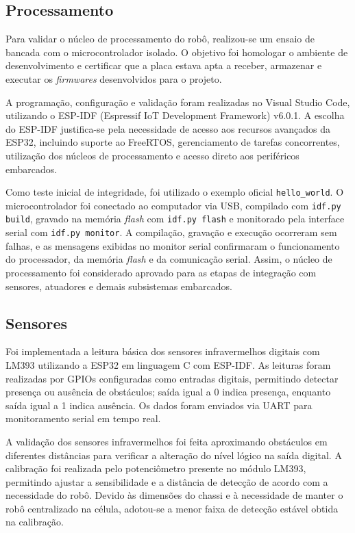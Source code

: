 \subsection{Processamento}

Para validar o núcleo de processamento do robô, realizou-se um ensaio de bancada
com o microcontrolador isolado. O objetivo foi homologar o ambiente de
desenvolvimento e certificar que a placa estava apta a receber, armazenar e
executar os \textit{firmwares} desenvolvidos para o projeto.

A programação, configuração e validação foram realizadas no Visual Studio Code,
utilizando o ESP-IDF (Espressif IoT Development Framework) v6.0.1. A escolha do
ESP-IDF justifica-se pela necessidade de acesso aos recursos avançados da ESP32,
incluindo suporte ao FreeRTOS, gerenciamento de tarefas concorrentes, utilização
dos núcleos de processamento e acesso direto aos periféricos embarcados.

Como teste inicial de integridade, foi utilizado o exemplo oficial
\texttt{hello\_world}. O microcontrolador foi conectado ao computador via USB,
compilado com \texttt{idf.py build}, gravado na memória \textit{flash} com
\texttt{idf.py flash} e monitorado pela interface serial com
\texttt{idf.py monitor}. A compilação, gravação e execução ocorreram sem falhas,
e as mensagens exibidas no monitor serial confirmaram o funcionamento do
processador, da memória \textit{flash} e da comunicação serial. Assim, o núcleo
de processamento foi considerado aprovado para as etapas de integração com
sensores, atuadores e demais subsistemas embarcados.

\subsection{Sensores}

Foi implementada a leitura básica dos sensores infravermelhos digitais com LM393
utilizando a ESP32 em linguagem C com ESP-IDF. As leituras foram realizadas por
GPIOs configuradas como entradas digitais, permitindo detectar presença ou
ausência de obstáculos; saída igual a 0 indica presença, enquanto saída igual a 1
indica ausência. Os dados foram enviados via UART para monitoramento serial em
tempo real.

A validação dos sensores infravermelhos foi feita aproximando obstáculos em
diferentes distâncias para verificar a alteração do nível lógico na saída
digital. A calibração foi realizada pelo potenciômetro presente no módulo LM393,
permitindo ajustar a sensibilidade e a distância de detecção de acordo com a
necessidade do robô. Devido às dimensões do chassi e à necessidade de manter o
robô centralizado na célula, adotou-se a menor faixa de detecção estável obtida
na calibração.

